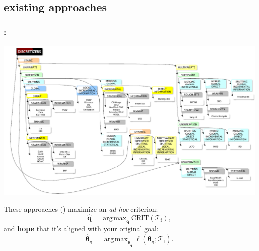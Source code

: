 \documentclass[english,xcolor={rgb,dvipsnames,table,usenames}]{beamer}
\DeclareMathOperator*{\argmax}{\arg\!\max}
\newcommand\q{{\bm{q}}}
\newcommand{\f}{\text{f}}
\begin{document}
\subsection{existing approaches}
\begin{frame}
\frametitle{\secname: \subsecname}

\vspace*{-0.25cm}
\begin{center}
\includegraphics[scale=0.3]{figures/taxonomy.PNG}
\end{center}
\vspace*{-0.2cm}
These approaches (\cite{wrapper2}) maximize an \textit{ad hoc} criterion:
\vspace*{-0.1cm}
\[ \hat{\q} = \argmax_{\q} \text{CRIT}(\mathcal{T}_\f), \]
\vspace*{-0.1cm}
and {\bf hope} that it's aligned with your original goal:
\vspace*{-0.1cm}
\[ \hat{\bm{\theta}}_{\hat{\q}} = \argmax_{\bm{\theta}_{\hat{\q}}} \ell(\bm{\theta}_{\hat{\q}} ; \mathcal{T}_\f). \]

\end{frame}
\end{document}

